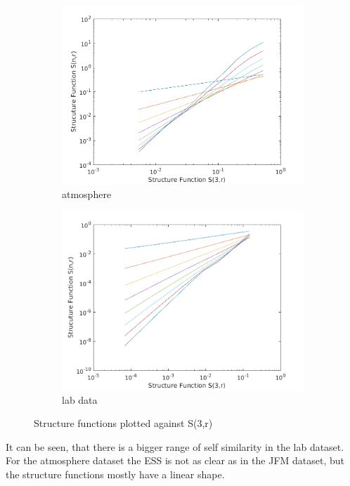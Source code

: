 \documentclass[12pt]{article}
\begin{document}
\begin{figure}[H]
\begin{subfigure}{0.5\textwidth}
  \centering
  \includegraphics[width=1\linewidth]{figures/ess_compare_atmo.png}
  \caption{atmosphere}
\end{subfigure}
\begin{subfigure}{0.5\textwidth}
  \centering
  \includegraphics[width=1\linewidth]{figures/ess_compare_center.png}
  \caption{lab data}
\end{subfigure}
\caption{Structure functions plotted against S(3,r)}
\label{fig:comparison_sr}
\end{figure}
It can be seen, that there is a bigger range of self similarity in the lab dataset. For the atmosphere dataset the ESS is not as clear as in the JFM dataset, but the structure functions mostly have a linear shape. 
\end{document}
